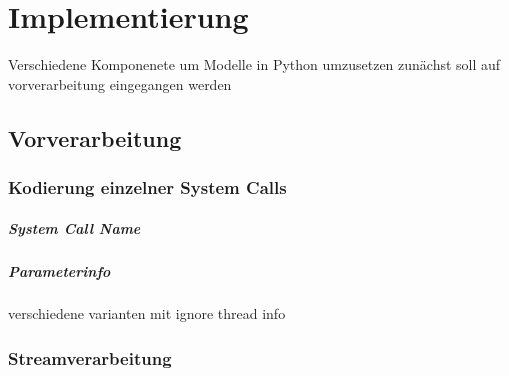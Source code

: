 \chapter{Implementierung}\label{ch:implementierung}
Verschiedene Komponenete um Modelle in Python umzusetzen 
zunächst soll auf vorverarbeitung eingegangen werden

\section{Vorverarbeitung}
\subsection{Kodierung einzelner System Calls}
\paragraph{System Call Name}
\paragraph{Parameterinfo}
verschiedene varianten mit ignore thread info
\subsection{Streamverarbeitung}
